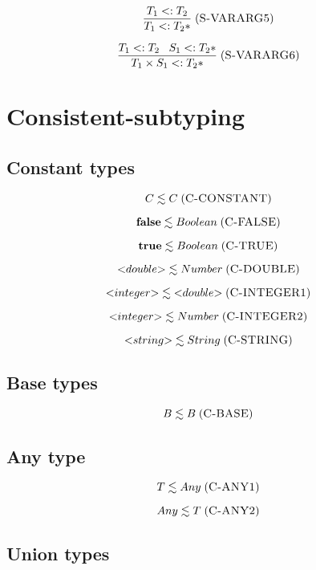 \documentclass[12pt]{article}
\newcommand{\mylabel}[1]{\; (\textsc{#1})}
\newcommand{\subtype}{<:}
\begin{document}
\[
\frac{T_{1} \subtype T_{2}}
     {T_{1} \subtype {T_{2}*}}
\mylabel{S-VARARG5}
\]

\[
\frac{T_{1} \subtype T_{2} \;\;\;
      S_{1} \subtype {T_{2}*}}
     {T_{1} \times S_{1} \subtype {T_{2}*}}
\mylabel{S-VARARG6}
\]

\section{Consistent-subtyping}

\subsection{Constant types}

\[
C \lesssim C
\mylabel{C-CONSTANT}
\]

\[
\mathbf{false} \lesssim Boolean
\mylabel{C-FALSE}
\]

\[
\mathbf{true} \lesssim Boolean
\mylabel{C-TRUE}
\]

\[
{<}double{>} \lesssim Number
\mylabel{C-DOUBLE}
\]

\[
{<}integer{>} \lesssim {<}double{>}
\mylabel{C-INTEGER1}
\]

\[
{<}integer{>} \lesssim Number
\mylabel{C-INTEGER2}
\]

\[
{<}string{>} \lesssim String
\mylabel{C-STRING}
\]

\subsection{Base types}

\[
B \lesssim B
\mylabel{C-BASE}
\]

%

\subsection{Any type}

\[
T \lesssim Any
\mylabel{C-ANY1}
\]

\[
Any \lesssim T
\mylabel{C-ANY2}
\]

\subsection{Union types}
\end{document}
